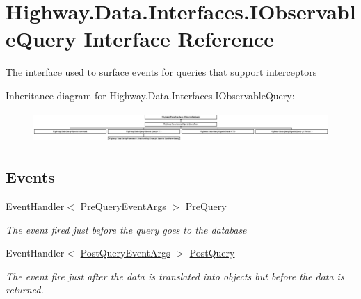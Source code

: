 \hypertarget{interface_highway_1_1_data_1_1_interfaces_1_1_i_observable_query}{\section{Highway.\-Data.\-Interfaces.\-I\-Observable\-Query Interface Reference}
\label{interface_highway_1_1_data_1_1_interfaces_1_1_i_observable_query}
}


The interface used to surface events for queries that support interceptors  


Inheritance diagram for Highway.\-Data.\-Interfaces.\-I\-Observable\-Query\-:\begin{figure}[H]
\begin{center}
\leavevmode
\includegraphics[height=1.183932cm]{interface_highway_1_1_data_1_1_interfaces_1_1_i_observable_query}
\end{center}
\end{figure}
\subsection*{Events}
\begin{DoxyCompactItemize}
\item 
Event\-Handler$<$ \hyperlink{class_highway_1_1_data_1_1_interceptors_1_1_events_1_1_pre_query_event_args}{Pre\-Query\-Event\-Args} $>$ \hyperlink{interface_highway_1_1_data_1_1_interfaces_1_1_i_observable_query_a1687e8dccf74ef87f98fe8ef6f1c99c3}{Pre\-Query}
\begin{DoxyCompactList}\small\item\em The event fired just before the query goes to the database \end{DoxyCompactList}\item 
Event\-Handler$<$ \hyperlink{class_highway_1_1_data_1_1_interceptors_1_1_events_1_1_post_query_event_args}{Post\-Query\-Event\-Args} $>$ \hyperlink{interface_highway_1_1_data_1_1_interfaces_1_1_i_observable_query_ac8cff5ce936c3611f965796ba9707c49}{Post\-Query}
\begin{DoxyCompactList}\small\item\em The event fire just after the data is translated into objects but before the data is returned. \end{DoxyCompactList}\end{DoxyCompactItemize}


